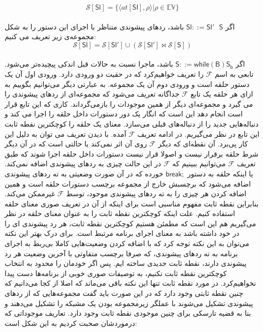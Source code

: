\begin{defn}
$$\mathcal{S} [\mathsf{Sl}] = \{ \langle at[\mathsf{Sl}] , \rho \rangle | \rho \in \mathbb{EV}       \}        $$ \\

اگر $         \mathsf{Sl} ::= \mathsf{Sl' \:\:\: S}  $ باشد، ردهای پیشوندی متناظر با اجرای این دستور را به شکل مجموعه‌ی زیر تعریف می کنیم:
$$\mathcal{S} [\mathsf{Sl}] = \mathcal{S} [\mathsf{Sl'}] \cup( \mathcal{S} [\mathsf{Sl'}]
\Join \mathcal{S} [\mathsf{S}] )      $$ \\



اگر $         \mathsf{S} ::= \mathsf{while (B)S_b }   $ باشد، ماجرا نسبت به حالات قبل اندکی پیچیده‌تر می‌شود. تابعی به اسم $\mathcal{F} $ را تعریف خواهیم‌کرد که در حقیت دو ورودی دارد. ورودی اول آن یک دستور حلقه است و ورودی دوم آن یک مجموعه. به عبارتی دیگر می‌توانیم بگوییم به ازای هر حلقه یک تابع $\mathcal{F} $  جداگانه تعریف می‌شود که مجموعه‌ای از ردهای پیشوندی را می گیرد و مجموعه‌ای دیگر از همین موجودات را بازمی‌گرداند. کاری که این تابع قرار است انجام دهد این است که انگار یک دور دستورات داخل حلقه را اجرا می کند و دنباله‌هایی جدید را از دنباله‌های قبلی می‌سازد. معنای یک حلقه را کوچکترین نقطه ثابت این تابع در نظر می‌گیریم. در ادامه تعریف $\mathcal{F} $ آمده. با دیدن تعریف می توان به دلیل این کار پی‌برد. آن نقطه‌ای که دیگر $\mathcal{F} $ روی آن اثر نمی‌کند یا حالتی است که در آن دیگر شرط حلقه برقرار نیست و اصولا قرار نیست دستورات داخل حلقه اجرا شوند که طبق تعریف $\mathcal{F} $  می‌توانیم ببینیم که $\mathcal{F} $  در این حالت چیزی به ردهای پیشوندی اضافه نمی‌کند. یا اینکه حلقه به دستور $\mathsf{break;}$ خورده که در آن صورت وضعیتی به ته ردهای پیشوندی اضافه می‌شود که برچسبش خارج از مجموعه برچسب دستورات حلقه است و همین اضافه کردن هر چیزی را به ته ردهای پیشوندی موجود، توسط $\mathcal{F} $  غیرممکن می‌کند. بنابراین نقطه ثابت مفهوم مناسبی است برای اینکه از آن در تعریف صوری معنای حلقه استفاده کنیم. علت اینکه کوچکترین نقطه ثابت را به عنوان معنای حلقه در نظر می‌گیریم هم این است که مطمئن هستیم کوچکترین نقطه ثابت، هر رد پیشوندی ای را در خود داشته باشد به معنای اجرای برنامه مرتبط است. برای درک بهتر این نکته می‌توان به این نکته توجه کرد که با اضافه کردن وضعیت‌هایی کاملا بی‌ربط به اجرای برنامه به ته رد‌های پیشوندی، که صرفا برچسب متفاوتی با آخرین وضعیت هر رد پیشوندی دارند، نقطه ثابت جدیدی ساخته ایم. پس اگر خودمان را محدود به انتخاب کوچکترین نقطه ثابت نکنیم، به توصیفات صوری خوبی از برنامه‌ها دست پیدا نخواهیم‌کرد. در مورد نقطه ثابت تنها این نکته باقی می‌ماند که اصلا از کجا می‌دانیم که چنین نقطه ثابتی وجود دارد که در این صورت باید گفت مجموعه‌هایی که از ردهای پیشوندی تشکیل می‌شوند با عملگر زیرمجموعه بودن یک مشبکه را تشکیل می‌دهند و بنا به قضیه تارسکی\cite{tarski} برای چنین موجودی نقطه ثابت وجود دارد.
تعاریف موجوداتی که درموردشان صحبت کردیم به این شکل است:


\end{defn}

